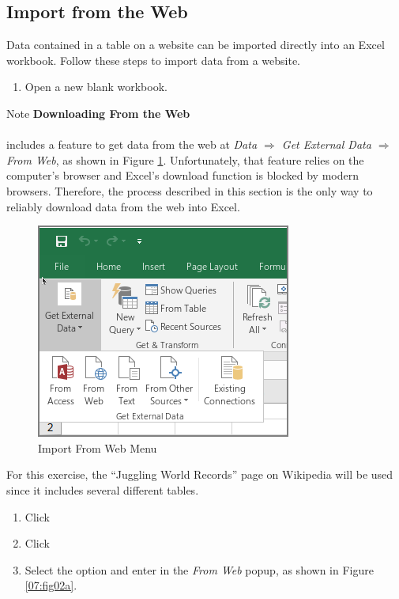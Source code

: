 \subsection{Import from the Web}

Data contained in a table on a website can be imported directly into an Excel workbook. Follow these steps to import data from a website.

\begin{enumerate}
	\item Open a new blank workbook.
\end{enumerate}

\begin{center}
	\begin{infobox}{Note}
		\textbf{Downloading From the Web}
		\\
		\\
		 includes a feature to get data from the web at \textit{Data $ \Rightarrow $ Get External Data $ \Rightarrow $ From Web}, as shown in Figure \ref{07:fig01}. Unfortunately, that feature relies on the computer's browser and Excel's download function is blocked by modern browsers. Therefore, the process described in this section is the only way to reliably download data from the web into Excel.
	\end{infobox}
\end{center}

\begin{figure}[H]
	\centering
	\includegraphics[width=\maxwidth{.75\linewidth}]{gfx/ch07_fig01}
	\caption{Import From Web Menu}
	\label{07:fig01}
\end{figure}

For this exercise, the ``Juggling World Records'' page on Wikipedia will be used since it includes several different tables.

\begin{enumerate}[resume]
	\item {} Click 
	\item {} Click 
	\item Select the  option and enter  in the \textit{From Web} popup, as shown in Figure \ref{07:fig02a}.
\end{enumerate}
	
